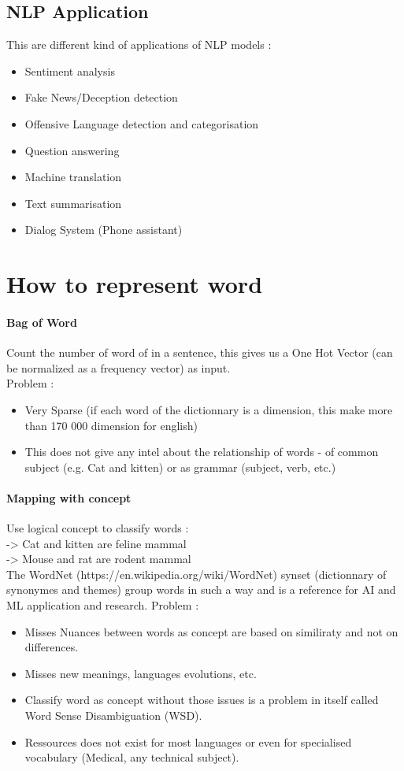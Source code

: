 			\subsection{NLP Application}
				This are different kind of applications of NLP models :
				\begin{itemize}
					\item Sentiment analysis
					\item Fake News/Deception detection
					\item Offensive Language detection and categorisation
					\item Question answering
					\item Machine translation
					\item Text summarisation
					\item Dialog System (Phone assistant)
				\end{itemize}

	\section{How to represent word}

		\paragraph{Bag of Word}
			Count the number of word of in a sentence, this gives us a One Hot Vector (can be normalized as a frequency vector) as input.\\
			Problem : 
			\begin{itemize}
				\item Very Sparse (if each word of the dictionnary is a dimension, this make more than 170 000 dimension for english)
				\item This does not give any intel about the relationship of words - of common subject (e.g. Cat and kitten) or as grammar (subject, verb, etc.)
			\end{itemize}
		\paragraph{Mapping with concept}
			Use logical concept to classify words : \\
			-> Cat and kitten are feline mammal \\
			-> Mouse and rat are rodent mammal\\
			The WordNet (https://en.wikipedia.org/wiki/WordNet) synset (dictionnary of synonymes and themes) group words in such a way and is a reference for AI and ML application and research.
			Problem :
			\begin{itemize}
				\item Misses Nuances between words as concept are based on similiraty and not on differences.
				\item Misses new meanings, languages evolutions, etc. 
				\item Classify word as concept without those issues is a problem in itself called Word Sense Disambiguation (WSD).
				\item Ressources does not exist for most languages or even for specialised vocabulary (Medical, any technical subject).
			\end{itemize}


